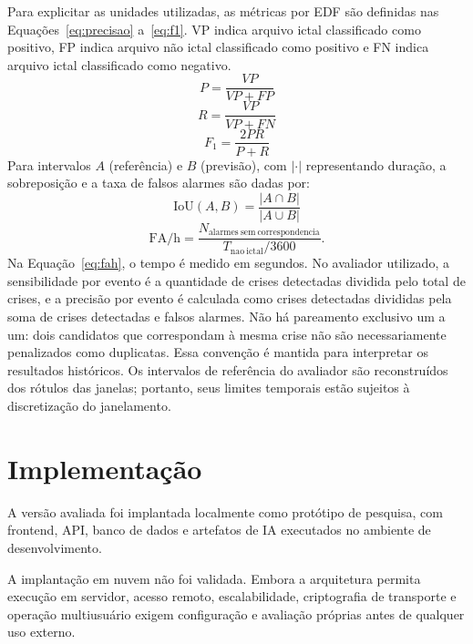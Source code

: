 Para explicitar as unidades utilizadas, as métricas por EDF são definidas nas Equações~\ref{eq:precisao} a~\ref{eq:f1}. VP indica arquivo ictal classificado como positivo, FP indica arquivo não ictal classificado como positivo e FN indica arquivo ictal classificado como negativo.
\begin{equation}\label{eq:precisao}
P=\frac{VP}{VP+FP}
\end{equation}
\begin{equation}\label{eq:recall}
R=\frac{VP}{VP+FN}
\end{equation}
\begin{equation}\label{eq:f1}
F_1=\frac{2PR}{P+R}
\end{equation}
Para intervalos $A$ (referência) e $B$ (previsão), com $|\cdot|$ representando duração, a sobreposição e a taxa de falsos alarmes são dadas por:
\begin{equation}\label{eq:iou}
\mathrm{IoU}(A,B)=\frac{|A\cap B|}{|A\cup B|}
\end{equation}
\begin{equation}\label{eq:fah}
\mathrm{FA/h}=\frac{N_{\mathrm{alarmes\ sem\ correspondencia}}}{T_{\mathrm{nao\ ictal}}/3600}.
\end{equation}
Na Equação~\ref{eq:fah}, o tempo é medido em segundos. No avaliador utilizado, a sensibilidade por evento é a quantidade de crises detectadas dividida pelo total de crises, e a precisão por evento é calculada como crises detectadas divididas pela soma de crises detectadas e falsos alarmes. Não há pareamento exclusivo um a um: dois candidatos que correspondam à mesma crise não são necessariamente penalizados como duplicatas. Essa convenção é mantida para interpretar os resultados históricos. Os intervalos de referência do avaliador são reconstruídos dos rótulos das janelas; portanto, seus limites temporais estão sujeitos à discretização do janelamento.

\section{Implementação}
A versão avaliada foi implantada localmente como protótipo de pesquisa, com frontend, API, banco de dados e artefatos de IA executados no ambiente de desenvolvimento.

A implantação em nuvem não foi validada. Embora a arquitetura permita execução em servidor, acesso remoto, escalabilidade, criptografia de transporte e operação multiusuário exigem configuração e avaliação próprias antes de qualquer uso externo.

